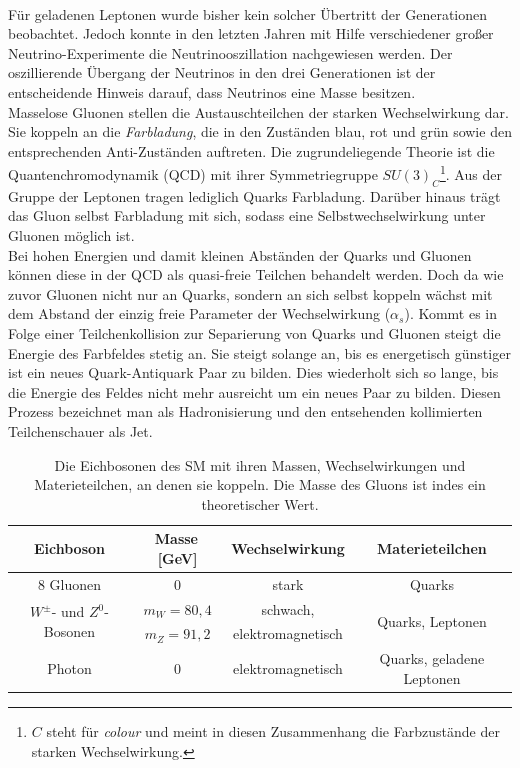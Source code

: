 \\
F\"ur geladenen Leptonen wurde bisher kein solcher \"Ubertritt der Generationen beobachtet. Jedoch konnte in den letzten Jahren mit Hilfe verschiedener gro\ss{}er Neutrino-Experimente die Neutrinooszillation nachgewiesen werden. Der oszillierende \"Ubergang der Neutrinos in den drei Generationen ist der entscheidende Hinweis darauf, dass Neutrinos eine Masse besitzen.  
\\
Masselose Gluonen stellen die Austauschteilchen der starken Wechselwirkung dar. Sie koppeln an die \textit{Farbladung}, die in den Zust\"anden blau, rot und gr\"un sowie den entsprechenden Anti-Zust\"anden auftreten. Die zugrundeliegende Theorie ist die Quantenchromodynamik (QCD) mit ihrer Symmetriegruppe $SU(3)_{C}$\footnote{$C$ steht f\"ur \textit{colour} und meint in diesen Zusammenhang die Farbzust\"ande der starken Wechselwirkung.}. Aus der Gruppe der Leptonen tragen lediglich Quarks Farbladung. Dar\"uber hinaus tr\"agt das Gluon selbst Farbladung mit sich, sodass eine Selbstwechselwirkung unter Gluonen m\"oglich ist.
\\
Bei hohen Energien und damit kleinen Abst\"anden der Quarks und Gluonen k\"onnen diese in der QCD als quasi-freie Teilchen behandelt werden. Doch da wie zuvor Gluonen nicht nur an Quarks, sondern an sich selbst koppeln w\"achst mit dem Abstand der einzig freie Parameter der Wechselwirkung ($\alpha_{s}$). Kommt es in Folge einer Teilchenkollision zur Separierung von Quarks und Gluonen steigt die Energie des Farbfeldes stetig an. Sie steigt solange an, bis es energetisch g\"unstiger ist ein neues Quark-Antiquark Paar zu bilden. Dies wiederholt sich so lange, bis die Energie des Feldes nicht mehr ausreicht um ein neues Paar zu bilden. Diesen Prozess bezeichnet man als Hadronisierung und den entsehenden kollimierten Teilchenschauer als Jet. 
\\
\begin{table}[tp]
\centering
\begin{tabular}{c||c|c|c}
Eichboson & Masse\,[GeV] & Wechselwirkung & Materieteilchen \\ \hline\hline
8 Gluonen & 0 & stark & Quarks \\ \hline
\multirow{2}{*}{$W^{\pm}$- und $Z^{0}$-Bosonen} & $m_{W}=80,4$ & schwach, & \multirow{2}{*}{Quarks, Leptonen} \\
 & $m_{Z}=91,2$ & elektromagnetisch & \\ \hline
Photon & 0 & elektromagnetisch & Quarks, geladene Leptonen\\ \hline
\end{tabular}
	  	\caption{Die Eichbosonen des SM mit ihren Massen, Wechselwirkungen und Materie\-teilchen, an denen sie koppeln. Die Masse des Gluons ist indes ein theo\-re\-tischer Wert.}
	  		\label{Eichbosonen}
\end{table}


